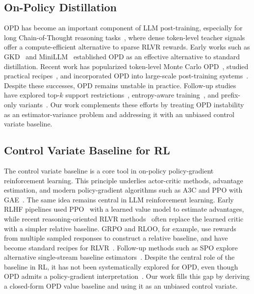 \documentclass{article}
\begin{document}
\subsection{On-Policy Distillation}
\label{sec:related-opd}
OPD has become an important component of LLM post-training, especially for long Chain-of-Thought reasoning tasks~\citep{wei2022chain}, where dense token-level teacher signals offer a compute-efficient alternative to sparse RLVR rewards. Early works such as GKD~\citep{agarwal2024onpolicy} and MiniLLM~\citep{gu2024minillm} established OPD as an effective alternative to standard distillation. Recent work has popularized token-level Monte Carlo OPD~\citep{lu2025onpolicydistillation}, studied practical recipes~\citep{patino2025opd,li2026rethinkingopd}, and incorporated OPD into large-scale post-training systems~\citep{yang2025qwen3,zeng2026glm,yang2026nemotron2,deepseekai2026deepseekv4}. Despite these successes, OPD remains unstable in practice. Follow-up studies have explored top-$k$ support restrictions~\citep{li2026rethinkingopd}, entropy-aware training~\citep{jin2026entropy}, and prefix-only variants~\citep{zhang2026prefixopd}. Our work complements these efforts by treating OPD instability as an estimator-variance problem and addressing it with an unbiased control variate baseline.
\subsection{Control Variate Baseline for RL}
\label{sec:related-baselines}
The control variate baseline is a core tool in on-policy policy-gradient reinforcement learning. This principle underlies actor-critic methods, advantage estimation, and modern policy-gradient algorithms such as A3C and PPO with GAE~\citep{williams1992simple,sutton1999policygrad,mnih2016asynchronous,schulman2017ppo,schulman2016high}. The same idea remains central in LLM reinforcement learning. Early RLHF pipelines used PPO~\citep{ouyang2022rlhf, schulman2017ppo} with a learned value model to estimate advantages, while recent reasoning-oriented RLVR methods~\citep{lambert2024tulu} often replace the learned critic with a simpler relative baseline. GRPO and RLOO, for example, use rewards from multiple sampled responses to construct a relative baseline, and have become standard recipes for RLVR~\citep{ahmadian2024back,shao2024deepseekmath,guo2025deepseek, yu2025dapo}. Follow-up methods such as SPO explore alternative single-stream baseline estimators~\citep{xu2025spo}. Despite the central role of the baseline in RL, it has not been systematically explored for OPD, even though OPD admits a policy-gradient interpretation~\citep{lu2025onpolicydistillation,ko2026scaling,jin2026entropy}. Our work fills this gap by deriving a closed-form OPD value baseline and using it as an unbiased control variate.
\end{document}
